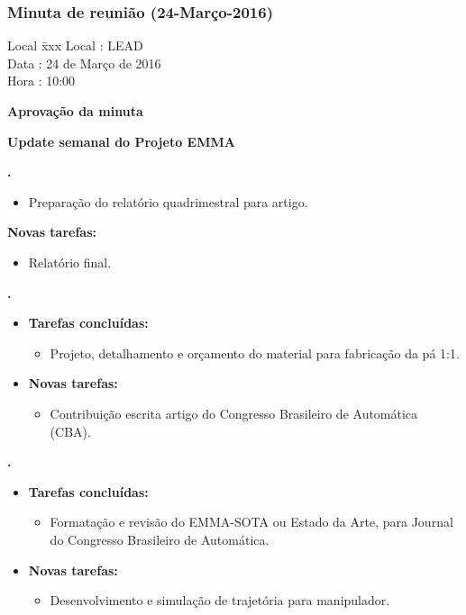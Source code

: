 \subsubsection{Minuta de reunião (24-Março-2016)}

\begin{tabbing}
  Local \= xxx \kill
  Local \> : LEAD \\
  Data  \> : 24 de Março de 2016 \\
  Hora  \> : 10:00
\end{tabbing} 


\textbf{Aprovação da minuta}

\textbf{Update semanal do Projeto EMMA}

						
\textbf{\gabriel.} 
	\begin{itemize}
			\item Preparação do relatório quadrimestral para artigo.
			\end{itemize}
		
		\item \textbf{Novas tarefas:}
			\begin{itemize} 
			\item Relatório final.
			\end{itemize}

					
   \textbf{.} 
	\begin{itemize}
		\item \textbf{Tarefas concluídas:}
			\begin{itemize}    
 				\item Projeto, detalhamento e orçamento do material para fabricação da pá
			    1:1.				
			\end{itemize}
		
		\item \textbf{Novas tarefas:}
			\begin{itemize}  
			    \item Contribuição escrita artigo do Congresso Brasileiro de Automática
			    (CBA).
			\end{itemize}
	\end{itemize}

	
	  \textbf{\renan.} 
	\begin{itemize}
		\item \textbf{Tarefas concluídas:}
			\begin{itemize}    
			\item Formatação e revisão do EMMA-SOTA ou Estado da Arte, para Journal do
			Congresso Brasileiro de Automática.
			\end{itemize}
		
		\item \textbf{Novas tarefas:}
			\begin{itemize} 
				\item Desenvolvimento e simulação de trajetória para manipulador.
			\end{itemize}
	\end{itemize}			
			
